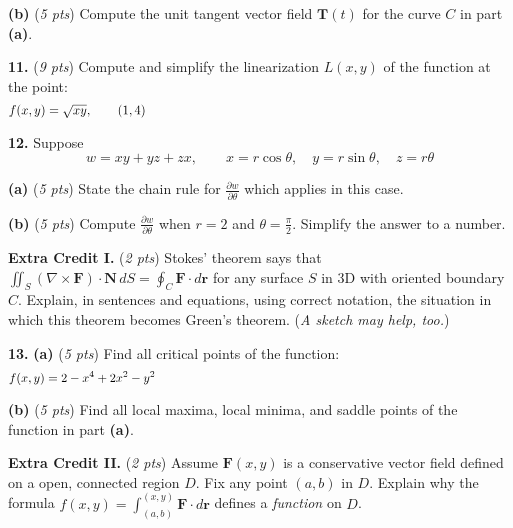 \documentclass[11pt]{amsart}
\newcommand{\br}{\mathbf{r}}
\newcommand{\bF}{\mathbf{F}}
\newcommand{\bN}{\mathbf{N}}
\newcommand{\bT}{\mathbf{T}}
\newcommand{\curl}{\nabla\times}
\newcommand{\ds}{\displaystyle}
\newcommand{\prob}[1]{\bigskip\noindent\textbf{#1.} }
\newcommand{\pts}[1]{(\emph{#1 pts})}
\newcommand{\probpts}[2]{\prob{#1} \pts{#2} \quad}
\newcommand{\ppartpts}[2]{\textbf{(#1)} \pts{#2} \quad}
\newcommand{\epartpts}[2]{\medskip\noindent \textbf{(#1)} \pts{#2} \quad}
\begin{document}
\epartpts{b}{5}  Compute the unit tangent vector field $\bT(t)$ for the curve $C$ in part \textbf{(a)}.
\vfill

\probpts{11}{9}  Compute and simplify the linearization $L(x,y)$ of the function at the point:
    $$f(x,y) = \sqrt{xy}, \qquad (1,4) \hspace{4.0in}$$
\vfill


\clearpage\newpage
\prob{12}  Suppose
    $$w=xy+yz+zx, \qquad x=r\cos\theta, \quad y=r\sin\theta, \quad z=r\theta$$

\epartpts{a}{5}  State the chain rule for $\ds \frac{\partial w}{\partial \theta}$ which applies in this case.
\vspace{1.5in}

\epartpts{b}{5}  Compute $\ds \frac{\partial w}{\partial \theta}$ when $r=2$ and $\ds \theta=\frac{\pi}{2}$.  Simplify the answer to a number.
\vfill

\probpts{Extra Credit I}{2}  Stokes' theorem says that $\ds \iint_S (\curl\bF)\cdot \bN\,dS = \oint_C \bF\cdot d\br$ for any surface $S$ in 3D with oriented boundary $C$.  Explain, in sentences and equations, using correct notation, the situation in which this theorem becomes Green's theorem.  (\emph{A sketch may help, too.})
\vspace{2.0in}


\clearpage\newpage
\prob{13} \ppartpts{a}{5}  Find all critical points of the function:
    $$f(x,y)=2-x^4+2x^2-y^2 \hspace{4.0in}$$
\vfill

\epartpts{b}{5}  Find all local maxima, local minima, and saddle points of the function in part \textbf{(a)}.
\vfill

\probpts{Extra Credit II}{2}  Assume $\bF(x,y)$ is a conservative vector field defined on a open, connected region $D$.  Fix any point $(a,b)$ in $D$.  Explain why the formula $\ds f(x,y) = \int_{(a,b)}^{(x,y)} \bF\cdot d\br$ defines a \emph{function} on $D$.
\vspace{2.0in}

\end{document}
